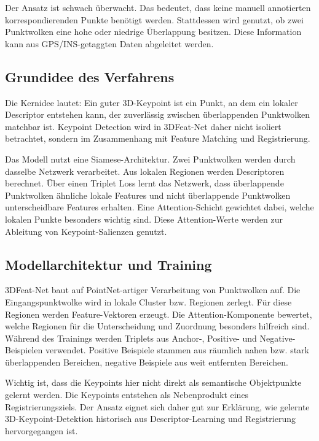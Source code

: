 \documentclass[11pt,a4paper]{article}
\begin{document}
Der Ansatz ist schwach überwacht. Das bedeutet, dass keine manuell annotierten korrespondierenden Punkte benötigt werden. Stattdessen wird genutzt, ob zwei Punktwolken eine hohe oder niedrige Überlappung besitzen. Diese Information kann aus GPS/INS-getaggten Daten abgeleitet werden.

\subsection{Grundidee des Verfahrens}

Die Kernidee lautet: Ein guter 3D-Keypoint ist ein Punkt, an dem ein lokaler Descriptor entstehen kann, der zuverlässig zwischen überlappenden Punktwolken matchbar ist. Keypoint Detection wird in 3DFeat-Net daher nicht isoliert betrachtet, sondern im Zusammenhang mit Feature Matching und Registrierung.

Das Modell nutzt eine Siamese-Architektur. Zwei Punktwolken werden durch dasselbe Netzwerk verarbeitet. Aus lokalen Regionen werden Descriptoren berechnet. Über einen Triplet Loss lernt das Netzwerk, dass überlappende Punktwolken ähnliche lokale Features und nicht überlappende Punktwolken unterscheidbare Features erhalten. Eine Attention-Schicht gewichtet dabei, welche lokalen Punkte besonders wichtig sind. Diese Attention-Werte werden zur Ableitung von Keypoint-Salienzen genutzt.

\subsection{Modellarchitektur und Training}

3DFeat-Net baut auf PointNet-artiger Verarbeitung von Punktwolken auf. Die Eingangspunktwolke wird in lokale Cluster bzw. Regionen zerlegt. Für diese Regionen werden Feature-Vektoren erzeugt. Die Attention-Komponente bewertet, welche Regionen für die Unterscheidung und Zuordnung besonders hilfreich sind. Während des Trainings werden Triplets aus Anchor-, Positive- und Negative-Beispielen verwendet. Positive Beispiele stammen aus räumlich nahen bzw. stark überlappenden Bereichen, negative Beispiele aus weit entfernten Bereichen.

Wichtig ist, dass die Keypoints hier nicht direkt als semantische Objektpunkte gelernt werden. Die Keypoints entstehen als Nebenprodukt eines Registrierungsziels. Der Ansatz eignet sich daher gut zur Erklärung, wie gelernte 3D-Keypoint-Detektion historisch aus Descriptor-Learning und Registrierung hervorgegangen ist.
\end{document}
